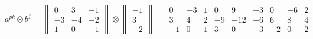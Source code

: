 \documentclass{article}
\begin{document}
\begin{center}
$$a^{pk}\otimes b^j = \begin{Vmatrix}
0 & 3 & -1 \\ -3 & -4 & -2 \\ 1 & 0 & -1
\end{Vmatrix} \otimes \begin{Vmatrix}
-1 \\ 3 \\ -2
\end{Vmatrix} = \begin{array}{||ccc|ccc|ccc||}
0 & -3 & 1 & 0 & 9 & -3 & 0 & -6 & 2 \\
3 & 4 & 2 & -9 & -12 & -6 & 6 & 8 & 4 \\
-1 & 0 & 1 & 3 & 0 & -3 & -2 & 0 & 2
\end{array}$$
\end{center}
\end{document}
